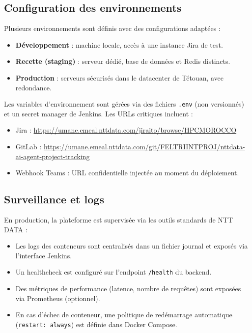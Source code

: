 \subsection{Configuration des environnements}
Plusieurs environnements sont définis avec des configurations adaptées :
\begin{itemize}
    \renewcommand{\labelitemi}{—}
    \item \textbf{Développement} : machine locale, accès à une instance Jira de test.
    \item \textbf{Recette (staging)} : serveur dédié, base de données et Redis distincts.
    \item \textbf{Production} : serveurs sécurisés dans le datacenter de Tétouan, avec redondance.
\end{itemize}
Les variables d’environnement sont gérées via des fichiers \texttt{.env} (non versionnés) et un secret manager de Jenkins. Les URLs critiques incluent :
\begin{itemize}
    \renewcommand{\labelitemi}{—}
    \item Jira : \url{https://umane.emeal.nttdata.com/jiraito/browse/HPCMOROCCO}
    \item GitLab : \url{https://umane.emeal.nttdata.com/git/FELTRIINTPROJ/nttdata-ai-agent-project-tracking}
    \item Webhook Teams : URL confidentielle injectée au moment du déploiement.
\end{itemize}

\subsection{Surveillance et logs}
En production, la plateforme est supervisée via les outils standards de NTT DATA :
\begin{itemize}
    \renewcommand{\labelitemi}{—}
    \item Les logs des conteneurs sont centralisés dans un fichier journal et exposés via l’interface Jenkins.
    \item Un healthcheck est configuré sur l’endpoint \texttt{/health} du backend.
    \item Des métriques de performance (latence, nombre de requêtes) sont exposées via Prometheus (optionnel).
    \item En cas d’échec de conteneur, une politique de redémarrage automatique (\texttt{restart: always}) est définie dans Docker Compose.
\end{itemize}

